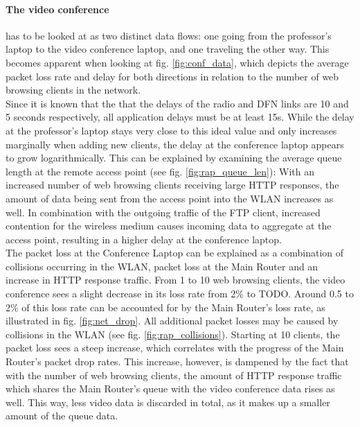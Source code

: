 \documentclass[
10pt, %
a4paper, %
oneside, %
headinclude,footinclude, %
BCOR5mm, %
]{scrartcl}
\begin{document}
\paragraph{The video conference} has to be looked at as two distinct data flows: one going from the professor's laptop to the video conference laptop, and one traveling the other way. This becomes apparent when looking at fig. \ref{fig:conf_data}, which depicts the average packet loss rate and delay for both directions in relation to the number of web browsing clients in the network.\\
Since it is known that the that the delays of the radio and DFN links are 10 and 5 seconds respectively, all application delays must be at least 15s. While the delay at the professor's laptop stays very close to this ideal value and only increases marginally when adding new clients, the delay at the conference laptop appears to grow logarithmically. This can be explained by examining the average queue length at the remote access point (see fig. \ref{fig:rap_queue_len}): With an increased number of web browsing clients receiving large HTTP responses, the amount of data being sent from the access point into the WLAN increases as well. In combination with the outgoing traffic of the FTP client, increased contention for the wireless medium causes incoming data to aggregate at the access point, resulting in a higher delay at the conference laptop.\\
The packet loss at the Conference Laptop can be explained as a combination of collisions occurring in the WLAN, packet loss at the Main Router and an increase in HTTP response traffic. From 1 to 10 web browsing clients, the video conference sees a slight decrease in its loss rate from 2\% to TODO. Around 0.5 to 2\% of this loss rate can be accounted for by the Main Router's loss rate, as illustrated in fig. \ref{fig:net_drop}. All additional packet losses may be caused by collisions in the WLAN (see fig. \ref{fig:rap_collisions}). Starting at 10 clients, the packet loss sees a steep increase, which correlates with the progress of the Main Router's packet drop rates. This increase, however, is dampened by the fact that with the number of web browsing clients, the amount of HTTP response traffic which shares the Main Router's queue with the video conference data rises as well. This way, less video data is discarded in total, as it makes up a smaller amount of the queue data.
\end{document}
